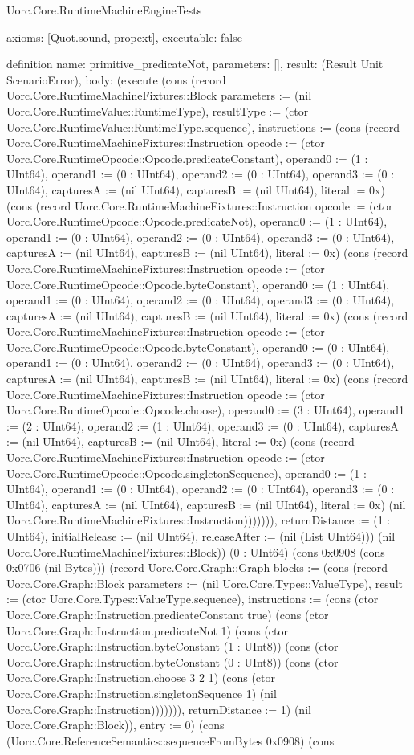 \begin{lexlean}{Uorc.Core.RuntimeMachineEngineTests}
\begin{semanticmodule}
{  axioms: [Quot.sound, propext],
  executable: false
}

definition{
  name: primitive_predicateNot,
  parameters: [],
  result: (Result Unit ScenarioError),
  body: (execute (cons (record Uorc.Core.RuntimeMachineFixtures::Block {parameters := (nil Uorc.Core.RuntimeValue::RuntimeType), resultType := (ctor Uorc.Core.RuntimeValue::RuntimeType.sequence), instructions := (cons (record Uorc.Core.RuntimeMachineFixtures::Instruction {opcode := (ctor Uorc.Core.RuntimeOpcode::Opcode.predicateConstant), operand0 := (1 : UInt64), operand1 := (0 : UInt64), operand2 := (0 : UInt64), operand3 := (0 : UInt64), capturesA := (nil UInt64), capturesB := (nil UInt64), literal := 0x}) (cons (record Uorc.Core.RuntimeMachineFixtures::Instruction {opcode := (ctor Uorc.Core.RuntimeOpcode::Opcode.predicateNot), operand0 := (1 : UInt64), operand1 := (0 : UInt64), operand2 := (0 : UInt64), operand3 := (0 : UInt64), capturesA := (nil UInt64), capturesB := (nil UInt64), literal := 0x}) (cons (record Uorc.Core.RuntimeMachineFixtures::Instruction {opcode := (ctor Uorc.Core.RuntimeOpcode::Opcode.byteConstant), operand0 := (1 : UInt64), operand1 := (0 : UInt64), operand2 := (0 : UInt64), operand3 := (0 : UInt64), capturesA := (nil UInt64), capturesB := (nil UInt64), literal := 0x}) (cons (record Uorc.Core.RuntimeMachineFixtures::Instruction {opcode := (ctor Uorc.Core.RuntimeOpcode::Opcode.byteConstant), operand0 := (0 : UInt64), operand1 := (0 : UInt64), operand2 := (0 : UInt64), operand3 := (0 : UInt64), capturesA := (nil UInt64), capturesB := (nil UInt64), literal := 0x}) (cons (record Uorc.Core.RuntimeMachineFixtures::Instruction {opcode := (ctor Uorc.Core.RuntimeOpcode::Opcode.choose), operand0 := (3 : UInt64), operand1 := (2 : UInt64), operand2 := (1 : UInt64), operand3 := (0 : UInt64), capturesA := (nil UInt64), capturesB := (nil UInt64), literal := 0x}) (cons (record Uorc.Core.RuntimeMachineFixtures::Instruction {opcode := (ctor Uorc.Core.RuntimeOpcode::Opcode.singletonSequence), operand0 := (1 : UInt64), operand1 := (0 : UInt64), operand2 := (0 : UInt64), operand3 := (0 : UInt64), capturesA := (nil UInt64), capturesB := (nil UInt64), literal := 0x}) (nil Uorc.Core.RuntimeMachineFixtures::Instruction))))))), returnDistance := (1 : UInt64), initialRelease := (nil UInt64), releaseAfter := (nil (List UInt64))}) (nil Uorc.Core.RuntimeMachineFixtures::Block)) (0 : UInt64) (cons 0x0908 (cons 0x0706 (nil Bytes))) (record Uorc.Core.Graph::Graph {blocks := (cons (record Uorc.Core.Graph::Block {parameters := (nil Uorc.Core.Types::ValueType), result := (ctor Uorc.Core.Types::ValueType.sequence), instructions := (cons (ctor Uorc.Core.Graph::Instruction.predicateConstant true) (cons (ctor Uorc.Core.Graph::Instruction.predicateNot 1) (cons (ctor Uorc.Core.Graph::Instruction.byteConstant (1 : UInt8)) (cons (ctor Uorc.Core.Graph::Instruction.byteConstant (0 : UInt8)) (cons (ctor Uorc.Core.Graph::Instruction.choose 3 2 1) (cons (ctor Uorc.Core.Graph::Instruction.singletonSequence 1) (nil Uorc.Core.Graph::Instruction))))))), returnDistance := 1}) (nil Uorc.Core.Graph::Block)), entry := 0}) (cons (Uorc.Core.ReferenceSemantics::sequenceFromBytes 0x0908) (cons }
\end{semanticmodule}
\end{lexlean}
